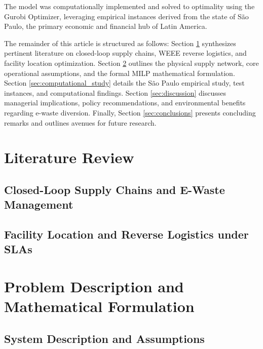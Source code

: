 \documentclass[preprint,12pt,authoryear]{elsarticle}
\begin{document}
The model was computationally implemented and solved to optimality using the Gurobi Optimizer, leveraging empirical instances derived from the state of S\~ao Paulo, the primary economic and financial hub of Latin America.

The remainder of this article is structured as follows: Section \ref{sec:lit_review} synthesizes pertinent literature on closed-loop supply chains, WEEE reverse logistics, and facility location optimization. Section \ref{sec:problem_formulation} outlines the physical supply network, core operational assumptions, and the formal MILP mathematical formulation. Section \ref{sec:computational_study} details the S\~ao Paulo empirical study, test instances, and computational findings. Section \ref{sec:discussion} discusses managerial implications, policy recommendations, and environmental benefits regarding e-waste diversion. Finally, Section \ref{sec:conclusions} presents concluding remarks and outlines avenues for future research.

\section{Literature Review}
\label{sec:lit_review}
\subsection{Closed-Loop Supply Chains and E-Waste Management}
\lipsum[19-28]

\subsection{Facility Location and Reverse Logistics under SLAs}
\lipsum[29-38]

\section{Problem Description and Mathematical Formulation}
\label{sec:problem_formulation}
\subsection{System Description and Assumptions}
\lipsum[39-48]
\end{document}
